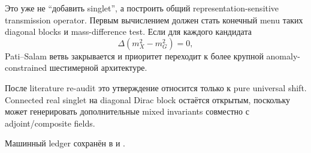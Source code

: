 Это уже не ``добавить singlet'', а построить общий representation-sensitive
transmission operator. Первым вычислением должен стать конечный menu таких
diagonal blocks и mass-difference test. Если для каждого кандидата
\begin{equation}
 \Delta(m_X^2-m_G^2)=0,
\end{equation}
Pati--Salam ветвь закрывается и приоритет переходит к более крупной
anomaly-constrained шестимерной архитектуре.

После literature re-audit это утверждение относится только к pure universal
shift. Connected real singlet на diagonal Dirac block остаётся открытым,
поскольку может генерировать дополнительные mixed invariants совместно с
adjoint/composite fields.

Машинный ledger сохранён в
 и
.